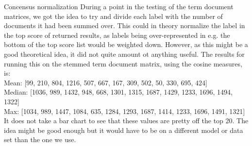 Concensus normalization
During a point in the testing of the term document matrices, we got the idea to try and divide each label with the number of documents it had been summed over. This could in theory normalize the label in the top score of returned results, as labels being over-represented in e.g. the bottom of the top score list would be weighted down. However, as this might be a good theoretical idea, it did not quite amount ot anything useful. The results for running this on the stemmed term document matrix, using the cosine measures, is: \\

Mean: [99, 210, 804, 1216, 507, 667, 167, 309, 502, 50, 330, 695, 424] \\
Median: [1036, 989, 1432, 948, 668, 1301, 1315, 1687, 1429, 1233, 1696, 1494, 1322] \\
Max: [1034, 989, 1447, 1084, 635, 1284, 1293, 1687, 1414, 1233, 1696, 1491, 1321] \\

It does not take a bar chart to see that these values are pretty off the top 20. The idea might be good enough but it would have to be on a different model or data set than the one we use.
